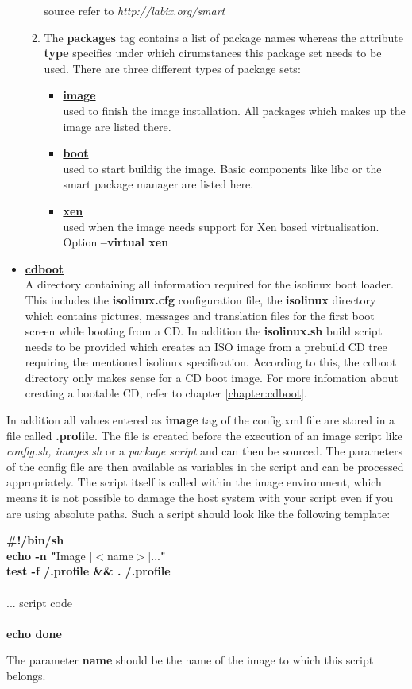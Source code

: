 \begin{itemize}
\begin{enumerate}
                source refer to \textit{http://labix.org/smart}
		  \item The \textbf{packages} tag contains a list of package names
                whereas the attribute \textbf{type} specifies under which
                cirumstances this package set needs to be used. There are
                three different types of package sets:
                \begin{itemize}
                \item \textbf{\underline{image}}\\
                      used to finish the image installation. All packages
                      which makes up the image are listed there.
                \item \textbf{\underline{boot}}\\
                      used to start buildig the image. Basic components
                      like libc or the smart package manager are listed
                      here.
                \item \textbf{\underline{xen}}\\
                      used when the image needs support for Xen based
                      virtualisation. Option \textbf{--virtual xen}
                \end{itemize} 
      \end{enumerate}
\item \textbf{\underline{cdboot}}\\
A directory containing all information required for the isolinux
boot loader. This includes the \textbf{isolinux.cfg} configuration
file, the \textbf{isolinux} directory which contains pictures, messages and
translation files for the first boot screen while booting from a CD.
In addition the \textbf{isolinux.sh} build script needs to be provided
which creates an ISO image from a prebuild CD tree requiring the mentioned
isolinux specification. According to this, the cdboot directory
only makes sense for a CD boot image. For more infomation about creating
a bootable CD, refer to chapter \ref{chapter:cdboot}.
\end{itemize}

In addition all values entered as \textbf{image} tag of the config.xml
file are stored in a file called \textbf{.profile}. The file is created
before the execution of an image script like \textit{config.sh, images.sh}
or a \textit{package script} and can then be sourced. The parameters
of the config file are then available as variables in the
script and can be processed appropriately. The script itself is called
within the image environment, which means it
is not possible to damage the host system with your script even if you
are using absolute paths. Such a script should look like the following
template:

\begin{Command}{9cm}
\textbf{\#!/bin/sh}\\
\textbf{echo -n "}Image [$<$name$>$]...\textbf{"}\\
\textbf{test -f /.profile \&\& . /.profile}\\
\\
... script code\\
\\
\textbf{echo done}
\end{Command}

The parameter \textbf{name} should be the name of the image to which this
script belongs.
